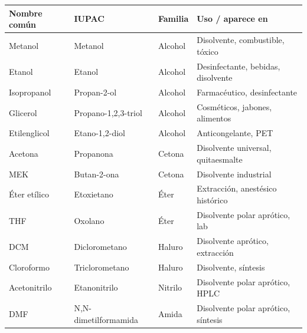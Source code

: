 \newpage


{}
\section*{\centering\fontsize{12}{18}}

\begin{longtable}{L{3.5cm} L{4.5cm} L{3.5cm} L{6.0cm}}
\toprule
\textbf{Nombre común} & \textbf{IUPAC} & \textbf{Familia} & \textbf{Uso / aparece en} \\
\midrule\endhead\bottomrule\endlastfoot
Metanol          & Metanol              & Alcohol         & Disolvente, combustible, tóxico \\
Etanol           & Etanol               & Alcohol         & Desinfectante, bebidas, disolvente \\
Isopropanol      & Propan-2-ol          & Alcohol         & Farmacéutico, desinfectante \\
Glicerol         & Propano-1,2,3-triol  & Alcohol         & Cosméticos, jabones, alimentos \\
Etilenglicol     & Etano-1,2-diol       & Alcohol         & Anticongelante, PET \\
Acetona          & Propanona            & Cetona          & Disolvente universal, quitaesmalte \\
MEK              & Butan-2-ona          & Cetona          & Disolvente industrial \\
Éter etílico     & Etoxietano           & Éter            & Extracción, anestésico histórico \\
THF              & Oxolano              & Éter            & Disolvente polar aprótico, lab \\
DCM              & Diclorometano        & Haluro          & Disolvente aprótico, extracción \\
Cloroformo       & Triclorometano       & Haluro          & Disolvente, síntesis \\
Acetonitrilo     & Etanonitrilo         & Nitrilo         & Disolvente polar aprótico, HPLC \\
DMF              & N,N-dimetilformamida & Amida           & Disolvente polar aprótico, síntesis \\

\end{longtable}
